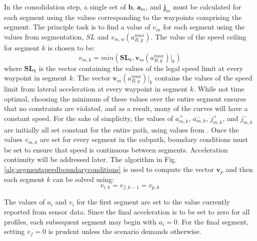 \documentclass[letterpaper, 10 pt, conference]{ieeeconf}  %
\begin{document}
In the consolidation step, a single set of $\mathbf{b}$, $\mathbf{a}_m$, and $\mathbf{j}_m$ 
must be calculated for each segment using the values corresponding to the waypoints comprising the segment.
The principle task is to find a value of $v_m$ for each segment using the values from segmentation, $SL$ and $v_{m,w}(a_{B,y}^{max})$. 
The value of the speed ceiling for segment $k$ is chosen to be:
\begin{equation}
  v_{m,k} = min \left ( \mathbf{SL}_k ,  \mathbf{v}_{m}(a_{B,y}^{max}) |_k \right )
\end{equation}
where $\mathbf{SL}_k$ is the vector containing the values of the legal speed limit at every waypoint in segment $k$.
The vector $\mathbf{v}_{m}(a_{B,y}^{max}) |_k$ contains the values of the speed limit from lateral acceleration at every waypoint in segment $k$.
While not time optimal, choosing the minimum of these values over the entire segment ensures that no constraints are violated, and as a result, many of the curves will have a constant speed.
For the sake of simplicity, the values of $a^+_{m,k}$, $a^-_{m,k}$, $j^+_{m,k}$, and $j^-_{m,k}$ are initially all set constant for the entire path, using values from \cite{Maurya2012,Hoberock1977,Long2000}.
Once the values $v_{m,k}$ are set for every segment in the subpath, boundary conditions must be set to ensure that speed is continuous between segments. Acceleration continuity will be addressed later.
The algorithm in Fig. \ref{alg:segmentspeedboundaryconditions} is used to compute the vector $\mathbf{v}_p$ and then each segment $k$ can be solved using:
\begin{equation}
  v_{i,k} = v_{f,k-1} = v_{p,k}
\end{equation}

The values of $a_i$ and $v_i$ for the first segment are set to the value currently reported from sensor data.
Since the final acceleration is to be set to zero for all profiles, each subsequent segment may begin with $a_i = 0$.
For the final segment, setting $v_f = 0$ is prudent unless the scenario demands otherwise.
\end{document}
